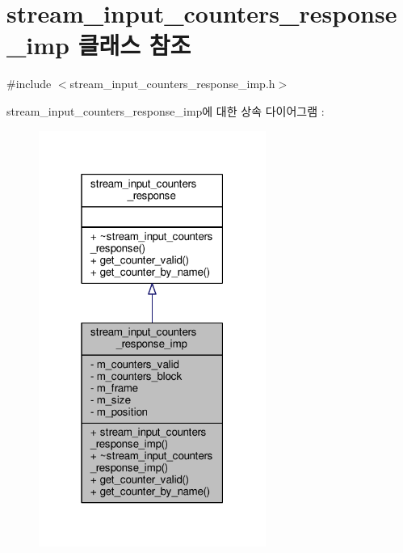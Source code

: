 \hypertarget{classavdecc__lib_1_1stream__input__counters__response__imp}{}\section{stream\+\_\+input\+\_\+counters\+\_\+response\+\_\+imp 클래스 참조}
\label{classavdecc__lib_1_1stream__input__counters__response__imp}


{\ttfamily \#include $<$stream\+\_\+input\+\_\+counters\+\_\+response\+\_\+imp.\+h$>$}



stream\+\_\+input\+\_\+counters\+\_\+response\+\_\+imp에 대한 상속 다이어그램 \+: 
\nopagebreak
\begin{figure}[H]
\begin{center}
\leavevmode
\includegraphics[width=211pt]{classavdecc__lib_1_1stream__input__counters__response__imp__inherit__graph}
\end{center}
\end{figure}


